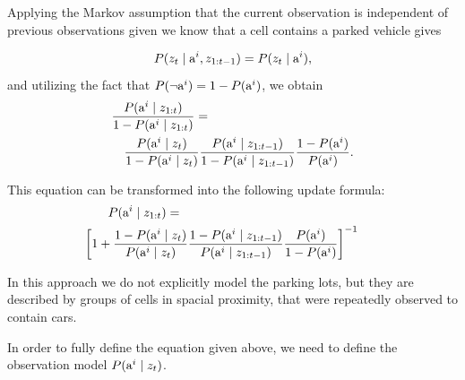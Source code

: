 Applying the Markov assumption that the current observation is independent of
previous observations given we know that a cell contains a parked vehicle
gives

\begin{equation}
P(z_{t} \mid {\mbox{a}^i}, z_{1:t-1}) = P(z_{t} \mid {\mbox{a}^i}),
\end{equation}
\noindent
and utilizing the fact that $P(\neg {\mbox{a}^i}) = 1 - P({\mbox{a}^i})$, we obtain
\begin{eqnarray}
\lefteqn{\frac{ P(\v \mid z_{1:t}) }{ 1 - P(\v \mid z_{1:t})} = } \nonumber \\
&&\frac{ P( \v \mid \z)}{ 1 - P(\v \mid \z)}   \frac{ P(\v \mid \y)}{ 1 - P(\v \mid  \y)}   \frac{ 1 - P(\v)}{ P(\v)}.
\end{eqnarray}

\noindent
This equation can be transformed into the following update formula:
\begin{eqnarray}
\label{eq:rec_update}
\hspace{-6mm}\lefteqn{P(\v\mid z_{1:t})=} \nonumber \\
&& \hspace{-10mm} \left[ 1 + \frac{1 - P(\v\mid \z)}{P(\v \mid \z)}
\frac{1 - P(\v \mid \y)}{P(\v \mid \y)}   \frac{P(\v)}{1 - P(\v)}  \right]^{-1}
\end{eqnarray}
\noindent

In this approach we do not explicitly model the parking lots, but they are
described by groups of cells in spacial proximity, that were repeatedly
observed to contain cars.

In order to fully define the equation given above, we need to define the
observation model $P({\mbox{a}^i} \mid z_t)$.


